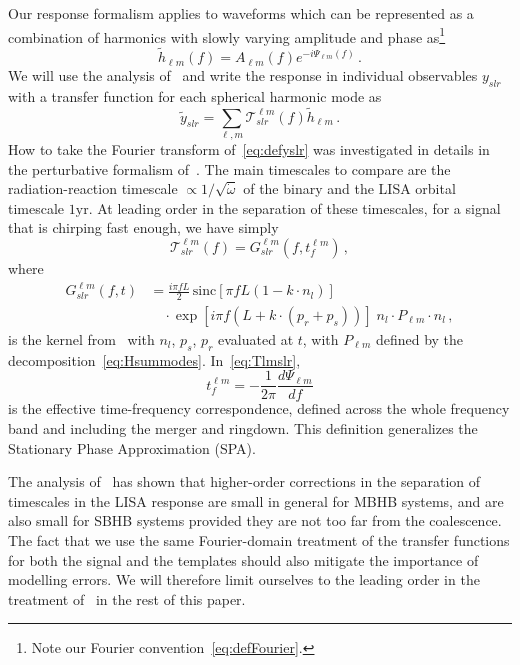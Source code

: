 \documentclass[aps,showpacs,twocolumn,prd,superscriptaddress,nofootinbib]{revtex4-1}
\newcommand{\be}{\begin{equation}}
\newcommand{\ee}{\end{equation}}
\newcommand\calT{{\mathcal{T}}}
\newcommand{\nn}{\nonumber}
\newcommand{\sinc}{\,\mathrm{sinc}}
\begin{document}
Our response formalism applies to waveforms which can be represented as a combination of harmonics with
slowly varying amplitude and phase as\footnote{Note our Fourier convention~\eqref{eq:defFourier}.}
\be\label{eq:hlmampphase}
	\tilde{h}_{\ell m} (f) = A_{\ell m} (f) e^{-i\Psi_{\ell m} (f)}\,.
\ee
We will use the analysis of~\cite{MB18} and write the response in individual observables $y_{slr}$ with a transfer function for each spherical harmonic mode as
\be
	\tilde{y}_{slr} = \sum_{\ell, m}\calT_{slr}^{\ell m}(f) \tilde{h}_{\ell m} \,.
\ee
How to take the Fourier transform of~\eqref{eq:defyslr} was investigated in details in the perturbative formalism of~\cite{MB18}. The main timescales to compare are the radiation-reaction timescale $\propto 1/\sqrt{\dot{\omega}}$ of the binary and the LISA orbital timescale $1\mathrm{yr}$. At  leading order in the separation of these timescales, for a signal that is chirping fast enough, we have simply
\be\label{eq:Tlmslr}
	\calT_{slr}^{\ell m}(f) = G_{slr}^{\ell m}(f, t_{f}^{\ell m}) \,,
\ee
where
\begin{align}\label{eq:Gslr}
	G_{slr}^{\ell m}(f,t) &= \frac{i \pi f L}{2} \sinc \left[ \pi f L\left(1-k\cdot n_{l} \right) \right] \nn\\
	& \quad \cdot \exp\left[ i \pi f \left( L + k\cdot \left( p_{r} + p_{s} \right) \right) \right] \; n_{l} \cdot P_{\ell m} \cdot n_{l} \,,
\end{align}
is the kernel from~\cite{MB18} with $n_{l}$, $p_{s}$, $p_{r}$ evaluated at $t$, with $P_{\ell m}$ defined by the decomposition~\eqref{eq:Hsummodes}. In~\eqref{eq:Tlmslr},
\be\label{eq:deftflm}
	t_{f}^{\ell m} = -\frac{1}{2\pi} \frac{d\Psi_{\ell m}}{df}
\ee
is the effective time-frequency correspondence, defined across the whole frequency band and including the merger and ringdown. This definition generalizes the Stationary Phase Approximation (SPA).

The analysis of~\cite{MB18} has shown that higher-order corrections in the separation of timescales in the LISA response are small in general for MBHB systems, and are also small for SBHB systems provided they are not too far from the coalescence. The fact that we use the same Fourier-domain treatment of the transfer functions for both the signal and the templates should also mitigate the importance of modelling errors. We will therefore limit ourselves to the leading order in the treatment of~\cite{MB18} in the rest of this paper.
\end{document}
